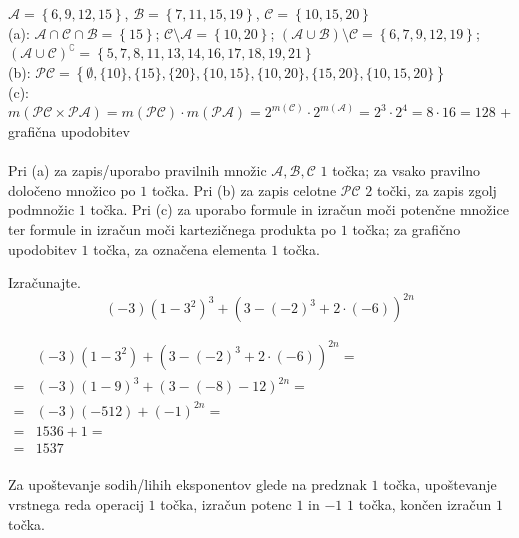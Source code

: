 \documentclass[addpoints]{exam}
\begin{document}
\begin{questions}
    \begin{solution}[9cm]
        $\mathcal{A}=\left\{6,9,12,15\right\}$, $\mathcal{B}=\left\{7,11,15,19\right\}$, $\mathcal{C}=\left\{10,15,20\right\}$ \\
        (a): $\mathcal{A}\cap\mathcal{C}\cap\mathcal{B}=\left\{15\right\}$; $\mathcal{C}\setminus\mathcal{A}=\left\{10,20\right\}$; $(\mathcal{A}\cup\mathcal{B})\setminus\mathcal{C}=\left\{6,7,9,12,19\right\}$; $(\mathcal{A}\cup\mathcal{C})^\complement=\left\{5,7,8,11,13,14,16,17,18,19,21\right\}$ \\
        (b): $\mathcal{PC}=\left\{\emptyset, \{10\}, \{15\}, \{20\}, \{10,15\}, \{10,20\}, \{15,20\}, \{10,15,20\}\right\}$ \\
        (c): $m(\mathcal{PC}\times\mathcal{PA})=m(\mathcal{PC})\cdot m(\mathcal{PA})=2^{m(\mathcal{C})}\cdot 2^{m(\mathcal{A})} = 2^3\cdot 2^4=8\cdot 16 = 128$ + grafična upodobitev\\ \\
        Pri (a) za zapis/uporabo pravilnih množic $\mathcal{A}, \mathcal{B}, \mathcal{C}$ $1$ točka; za vsako pravilno določeno množico po $1$ točka. Pri (b) za zapis celotne $\mathcal{PC}$ $2$ točki, za zapis zgolj podmnožic $1$ točka. 
        Pri (c) za uporabo formule in izračun moči potenčne množice ter formule in izračun moči kartezičnega produkta po $1$ točka; za grafično upodobitev $1$ točka, za označena elementa $1$ točka.
    \end{solution}






    \newpage
        

    \question[4]
    Izračunajte. $$ (-3)\left(1-3^2\right)^3+\left(3-(-2)^3+2\cdot(-6)\right)^{2n}$$

    \begin{solution}[7cm]
            $\begin{aligned}
                &(-3)\left(1-3^2\right)+\left(3-(-2)^3+2\cdot(-6)\right)^{2n}= \\
                    =& (-3)(1-9)^3+(3-(-8)-12)^{2n}=\\
                    =& (-3)(-512)+(-1)^{2n}= \\
                    =& 1536+1= \\
                    =& 1537
            \end{aligned} $ \\ \\
            Za upoštevanje sodih/lihih eksponentov glede na predznak $1$ točka, upoštevanje vrstnega reda operacij $1$ točka, izračun potenc $1$ in $-1$ $1$ točka, končen izračun $1$ točka.
    \end{solution}




\end{questions}
\end{document}
